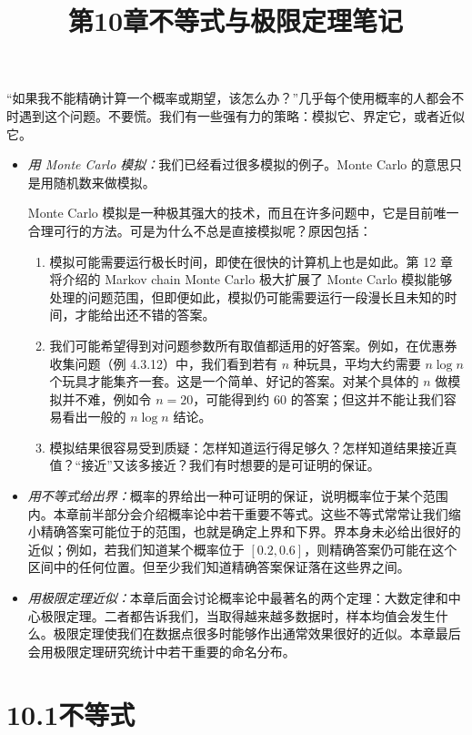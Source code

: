 \documentclass[UTF8,12pt,a4paper,fontset=fandol]{ctexart}
\title{第10章\quad 不等式与极限定理笔记}
\author{}
\date{}
\begin{document}
\maketitle

“如果我不能精确计算一个概率或期望，该怎么办？”几乎每个使用概率的人都会不时遇到这个问题。不要慌。我们有一些强有力的策略：模拟它、界定它，或者近似它。

\begin{itemize}
  \item \textit{用 Monte Carlo 模拟：}我们已经看过很多模拟的例子。Monte Carlo 的意思只是用随机数来做模拟。

  Monte Carlo 模拟是一种极其强大的技术，而且在许多问题中，它是目前唯一合理可行的方法。可是为什么不总是直接模拟呢？原因包括：
  \begin{enumerate}
    \item 模拟可能需要运行极长时间，即使在很快的计算机上也是如此。第 12 章将介绍的 Markov chain Monte Carlo 极大扩展了 Monte Carlo 模拟能够处理的问题范围，但即便如此，模拟仍可能需要运行一段漫长且未知的时间，才能给出还不错的答案。
    \item 我们可能希望得到对问题参数所有取值都适用的好答案。例如，在优惠券收集问题（例 4.3.12）中，我们看到若有 $n$ 种玩具，平均大约需要 $n\log n$ 个玩具才能集齐一套。这是一个简单、好记的答案。对某个具体的 $n$ 做模拟并不难，例如令 $n=20$，可能得到约 $60$ 的答案；但这并不能让我们容易看出一般的 $n\log n$ 结论。
    \item 模拟结果很容易受到质疑：怎样知道运行得足够久？怎样知道结果接近真值？“接近”又该多接近？我们有时想要的是可证明的保证。
  \end{enumerate}

  \item \textit{用不等式给出界：}概率的界给出一种可证明的保证，说明概率位于某个范围内。本章前半部分会介绍概率论中若干重要不等式。这些不等式常常让我们缩小精确答案可能位于的范围，也就是确定上界和下界。界本身未必给出很好的近似；例如，若我们知道某个概率位于 $[0.2,0.6]$，则精确答案仍可能在这个区间中的任何位置。但至少我们知道精确答案保证落在这些界之间。

  \item \textit{用极限定理近似：}本章后面会讨论概率论中最著名的两个定理：大数定律和中心极限定理。二者都告诉我们，当取得越来越多数据时，样本均值会发生什么。极限定理使我们在数据点很多时能够作出通常效果很好的近似。本章最后会用极限定理研究统计中若干重要的命名分布。
\end{itemize}

\section*{10.1\quad 不等式}
\end{document}
